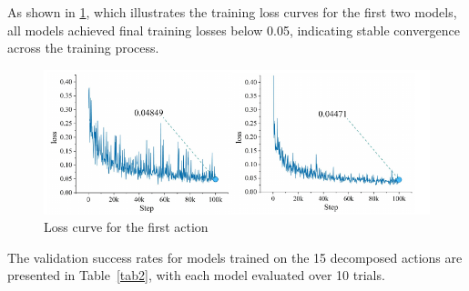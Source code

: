 \documentclass[runningheads]{llncs}
\begin{document}
As shown in \cref{fig14}, which illustrates the training loss curves for the first two models, all models achieved final training losses below 0.05, indicating stable convergence across the training process.


\begin{figure}[H]
\centering
\includegraphics[width=323pt]{fig15.pdf}
\caption{  Loss curve for the first action} \label{fig14}
\end{figure}


The validation success rates for models trained on the 15 decomposed actions are presented in Table~\ref{tab2}, with each model evaluated over 10 trials.
\end{document}
